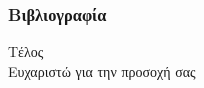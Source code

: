 \documentclass[10pt]{beamer}
\begin{document}
    \begin{frame}[t,allowframebreaks]
        \nocite{*}
        \frametitle{Βιβλιογραφία}
        \printbibliography
    \end{frame}

    \begin{frame}[c]
        \centering
        Τέλος \\[20pt]
        Ευχαριστώ για την προσοχή σας
    \end{frame}

%
\end{document}
